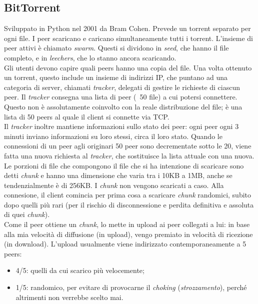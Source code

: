 \subsection{BitTorrent}
Sviluppato in Python nel 2001 da Bram Cohen.
Prevede un torrent separato per ogni file. I peer scaricano e caricano simultaneamente tutti i torrent. L'insieme di peer attivi è chiamato \textit{swarm}. Questi si dividono in \textit{seed}, che hanno il file completo, e in \textit{leechers}, che lo stanno ancora scaricando. \\
Gli utenti devono capire quali peers hanno una copia del file.
Una volta ottenuto un torrent, questo include un insieme di indirizzi IP, che puntano ad una categoria di server, chiamati \textit{tracker}, delegati di gestire le richieste di ciascun peer. Il \textit{tracker} consegna una lista di peer (~50 file) a cui potersi connettere. Questo non è assolutamente coinvolto con la reale distribuzione del file; è una lista di 50 peers al quale il client si connette via TCP. \\
Il \textit{tracker} inoltre mantiene informazioni sullo stato dei peer: ogni peer ogni 3 minuti inviano informazioni su loro stessi, circa il loro stato. Quando le connessioni di un peer agli originari 50 peer sono decrementate sotto le 20, viene fatta una nuova richiesta al \textit{tracker}, che sostituisce la lista attuale con una nuova. \\
Le porzioni di file che compongono il file che si ha intenzione di scaricare sono detti \textit{chunk} e hanno una dimensione che varia tra i 10KB a 1MB, anche se tendenzialmente è di 256KB. I \textit{chunk} non vengono scaricati a caso. Alla connesione, il client comincia per prima cosa a scaricare \textit{chunk} randomici, subito dopo quelli più rari (per il rischio di disconnessione e perdita definitiva e assoluta di quei \textit{chunk}). \\
Come il peer ottiene un \textit{chunk}, lo mette in upload ai peer collegati a lui: in base alla mia velocità di diffusione (in upload), vengo premiato in velocità di ricezione (in download).
L'upload usualmente viene indirizzato contemporaneamente a 5 peers:
\begin{itemize}
    \item 4/5: quelli da cui scarico più velocemente;
    \item 1/5: randomico, per evitare di provocarne il \textit{choking} (\textit{strozzamento}), perché altrimenti non verrebbe scelto mai.
\end{itemize}

